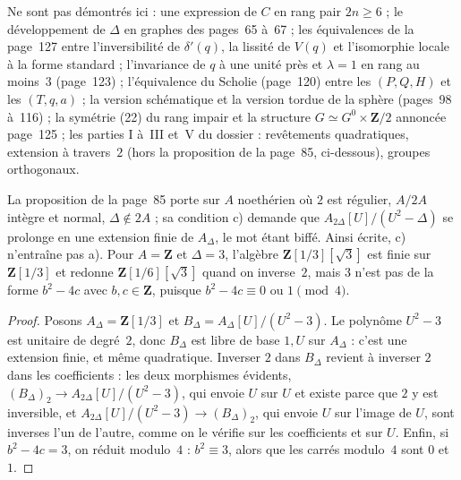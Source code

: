 Ne sont pas démontrés ici : une expression de $C$ en rang pair $2n \geq 6$ ; le développement de $\Delta$ en graphes des pages~65 à~67 ; les équivalences de la page~127 entre l'inversibilité de $\delta'(q)$, la lissité de $V(q)$ et l'isomorphie locale à la forme standard ; l'invariance de $q$ à une unité près et $\lambda = 1$ en rang au moins~$3$ (page~123) ; l'équivalence du Scholie (page~120) entre les $(P, Q, H)$ et les $(T, q, a)$ ; la version schématique et la version tordue de la sphère (pages~98 à~116) ; la symétrie (22) du rang impair et la structure $G \simeq G^0 \times \mathbf Z/2$ annoncée page~125 ; les parties I à~III et~V du dossier : revêtements quadratiques, extension à travers~$2$ (hors la proposition de la page~85, ci-dessous), groupes orthogonaux.

\begin{encadre}
\begin{contrexemple}
La proposition de la page~85 porte sur $A$ noethérien où $2$ est régulier, $A/2A$ intègre et normal, $\Delta \notin 2A$ ; sa condition c) demande que $A_{2\Delta}[U]/(U^2 - \Delta)$ se prolonge en une extension finie de $A_\Delta$, le mot  étant biffé. Ainsi écrite, c) n'entraîne pas a). Pour $A = \mathbf Z$ et $\Delta = 3$, l'algèbre $\mathbf Z[1/3][\sqrt 3]$ est finie sur $\mathbf Z[1/3]$ et redonne $\mathbf Z[1/6][\sqrt 3]$ quand on inverse~$2$, mais $3$ n'est pas de la forme $b^2 - 4c$ avec $b, c \in \mathbf Z$, puisque $b^2 - 4c \equiv 0$ ou $1 \pmod 4$.
\end{contrexemple}
\end{encadre}

\begin{proof}
Posons $A_\Delta = \mathbf Z[1/3]$ et $B_\Delta = A_\Delta[U]/(U^2 - 3)$. Le polynôme $U^2 - 3$ est unitaire de degré~$2$, donc $B_\Delta$ est libre de base $1, U$ sur $A_\Delta$ : c'est une extension finie, et même quadratique. Inverser $2$ dans $B_\Delta$ revient à inverser $2$ dans les coefficients : les deux morphismes évidents, $(B_\Delta)_2 \to A_{2\Delta}[U]/(U^2 - 3)$, qui envoie $U$ sur $U$ et existe parce que $2$ y est inversible, et $A_{2\Delta}[U]/(U^2 - 3) \to (B_\Delta)_2$, qui envoie $U$ sur l'image de $U$, sont inverses l'un de l'autre, comme on le vérifie sur les coefficients et sur $U$. Enfin, si $b^2 - 4c = 3$, on réduit modulo~$4$ : $b^2 \equiv 3$, alors que les carrés modulo~$4$ sont $0$ et~$1$.
\end{proof}

